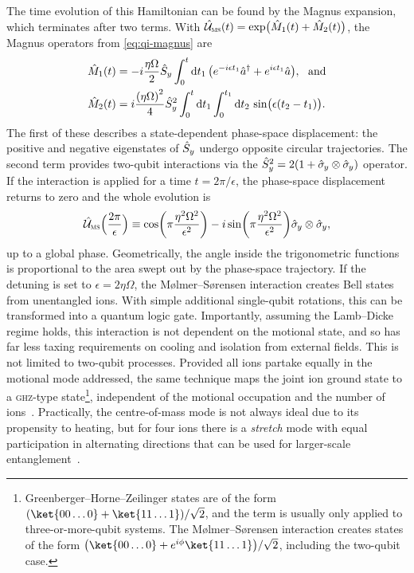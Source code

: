The time evolution of this Hamiltonian can be found by the Magnus expansion, which terminates after two terms.
With $\hat{\mathcal U}_{\text{{\textsc{ms}}}}(t) = \exp\bigl(\hat{M}_1(t) + \hat{M}_2(t)\bigr)$, the Magnus operators from \cref{eq:qi-magnus} are
\begin{equation}\label{eq:iontrap-ms-magnus}\begin{aligned}
\op M_1(t) &= -i \frac{\eta\Omega}2 \Sy\int_0^t\mathrm dt_1\,\bigl(e^{-i\epsilon t_1}\a^\dagger + e^{i\epsilon t_1}\a\bigr),\ \ \text{and}\\
\op M_2(t) &= i\frac{{(\eta\Omega)}^2}4 \Sy^2\int_0^t\mathrm dt_1\int_0^{t_1}\mathrm dt_2\,\sin\bigl(\epsilon(t_2-t_1)\bigr).
\end{aligned}\end{equation}
The first of these describes a state-dependent phase-space displacement: the positive and negative eigenstates of $\hat{S}_y$ undergo opposite circular trajectories.
The second term provides two-qubit interactions via the $\hat{S}_y^2 = 2(1 + \hat{\sigma}_{\mkern-1mu y}\otimes\hat{\sigma}_{\mkern-1mu y})$ operator.
If the interaction is applied for a time $t = 2\pi/\epsilon$, the phase-space displacement returns to zero and the whole evolution is
\begin{equation}\label{eq:iontrap-ms-u}
\hat{\mathcal U}_{\text{{\textsc{ms}}}}\Bigl(\frac{2\pi}\epsilon\Bigr) \equiv \cos\biggl(\pi\frac{\eta^2\Omega^2}{\epsilon^2}\biggr) - i\sin\biggl(\pi\frac{\eta^2\Omega^2}{\epsilon^2}\biggr)\hat{\sigma}_{\mkern-1mu y}\otimes\hat{\sigma}_{\mkern-1mu y},
\end{equation}
up to a global phase.
Geometrically, the angle inside the trigonometric functions is proportional to the area swept out by the phase-space trajectory.
If the detuning is set to $\epsilon = 2\eta\Omega$, the M\o lmer--S\o rensen interaction creates Bell states from unentangled ions.
With simple additional single-qubit rotations, this can be transformed into a quantum logic gate.
Importantly, assuming the Lamb--Dicke regime holds, this interaction is not dependent on the motional state, and so has far less taxing requirements on cooling and isolation from external fields.
This is not limited to two-qubit processes.
Provided all ions partake equally in the motional mode addressed, the same technique maps the joint ion ground state to a \textsc{ghz}-type state\footnote{%
    Greenberger--Horne--Zeilinger states are of the form $(\ket{00\dotso0} + \ket{11\dotso1})/\sqrt2$, and the term is usually only applied to three-or-more-qubit systems.
    The M\o lmer--S\o rensen interaction creates states of the form $\bigl(\ket{00\dotso0} + e^{i\phi}\ket{11\dotso1}\bigr)/\sqrt2$, including the two-qubit case.
}, independent of the motional occupation and the number of ions~\cite{Molmer1999,Solano1999}.
Practically, the centre-of-mass mode is not always ideal due to its propensity to heating, but for four ions there is a \emph{stretch} mode with equal participation in alternating directions that can be used for larger-scale entanglement~\cite{Sackett2000}.

